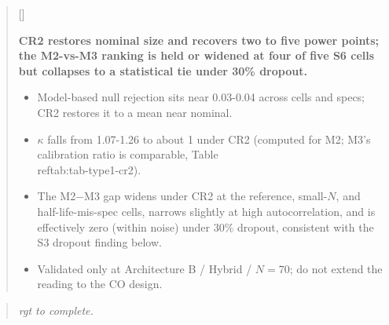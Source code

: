 \documentclass[
  11pt,
]{article}
\newcounter{pgraph}
\newenvironment{bullets}{%
  \stepcounter{pgraph}%
  \begin{quote}\small\sffamily\color[gray]{0.30}%
  {\normalfont\scriptsize\color[gray]{0.58}[\thepgraph]\enspace}}{%
  \end{quote}}
\newenvironment{rgt}{%
  \begin{quote}\small\itshape\color[RGB]{20,60,160}}{%
  \end{quote}}
\begin{document}
\begin{bullets}

\textbf{CR2 restores nominal size and recovers two to five power
points; the M2-vs-M3 ranking is held or widened at four of five S6
cells but collapses to a statistical tie under 30\% dropout.}

\begin{itemize}\setlength{\itemsep}{2pt}\setlength{\parskip}{0pt}
\item Model-based null rejection sits near 0.03-0.04 across cells and
specs; CR2 restores it to a mean near nominal.
\item $\kappa$ falls from 1.07-1.26 to about 1 under CR2 (computed
for M2; M3's calibration ratio is comparable, Table
\\ref{tab:tab-type1-cr2}).
\item The M2$-$M3 gap widens under CR2 at the reference, small-$N$,
and half-life-mis-spec cells, narrows slightly at high autocorrelation,
and is effectively zero (within noise) under 30\% dropout, consistent
with the S3 dropout finding below.
\item Validated only at Architecture B / Hybrid / $N = 70$; do not
extend the reading to the CO design.
\end{itemize}

\end{bullets}

\begin{rgt}
rgt to complete.

\end{rgt}
\end{document}
